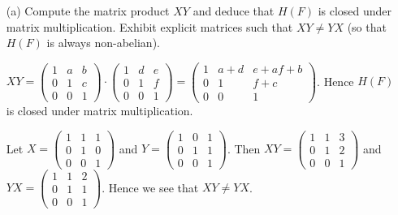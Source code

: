 \documentclass[12pt]{article}
\begin{document}
\begin{enumerate}
\begin{enumerate}
        \item[(a)] Compute the matrix product $XY$ and
        deduce that $H(F)$ is closed under matrix
        multiplication. Exhibit explicit matrices such that
        $XY\neq YX$ (so that $H(F)$ is always non-abelian).
        \begin{mybox}
            
            $XY=\left(\begin{array}{ccc}
                1 & a & b\\
                0 & 1 & c\\
                0 & 0 & 1 \end{array}
                \right)\cdot
                \left(\begin{array}{ccc}
                    1 & d & e\\
                    0 & 1 & f\\
                    0 & 0 & 1 \end{array}
                \right)
                =\left(\begin{array}{ccc}
                    1 & a+d & e+af+b\\
                    0 & 1 & f+c\\
                    0 & 0 & 1 \end{array}
                \right)$. Hence $H(F)$ is closed
                under matrix multiplication.

                \vspace*{2mm}
                Let $X=\left(\begin{array}{ccc}
                    1 & 1 & 1\\
                    0 & 1 & 0\\
                    0 & 0 & 1 \end{array}
                    \right)$ and
                    $Y=\left(\begin{array}{ccc}
                        1 & 0 & 1\\
                        0 & 1 & 1\\
                        0 & 0 & 1 \end{array}
                    \right)$. Then
                    $XY=\left(\begin{array}{ccc}
                        1 & 1 & 3\\
                        0 & 1 & 2\\
                        0 & 0 & 1 \end{array}
                    \right)$ and
                    $YX=\left(\begin{array}{ccc}
                        1 & 1 & 2\\
                        0 & 1 & 1\\
                        0 & 0 & 1 \end{array}
                    \right)$. Hence we see that
                    $XY\neq YX$.
        \end{mybox}


\end{enumerate}
\end{enumerate}
\end{document}
